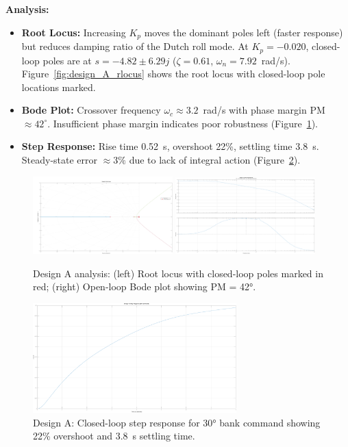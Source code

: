 \textbf{Analysis:}
\begin{itemize}
\item \textbf{Root Locus:} Increasing $K_p$ moves the dominant poles left (faster response) but reduces damping ratio of the Dutch roll mode. At $K_p=-0.020$, closed-loop poles are at $s = -4.82 \pm 6.29j$ ($\zeta=0.61$, $\omega_n=7.92$~rad/s). Figure~\ref{fig:design_A_rlocus} shows the root locus with closed-loop pole locations marked.
\item \textbf{Bode Plot:} Crossover frequency $\omega_c \approx 3.2$~rad/s with phase margin PM $\approx 42^\circ$. Insufficient phase margin indicates poor robustness (Figure~\ref{fig:design_A_bode}).
\item \textbf{Step Response:} Rise time 0.52~s, overshoot 22\%, settling time 3.8~s. Steady-state error $\approx 3\%$ due to lack of integral action (Figure~\ref{fig:design_A_step}).
\end{itemize}

\begin{figure}[h!]
\centering
\includegraphics[width=0.48\textwidth]{../MATLAB/LaTeX_Exports/design_A_root_locus.pdf}
\includegraphics[width=0.48\textwidth]{../MATLAB/LaTeX_Exports/design_A_bode.pdf}
\caption{Design A analysis: (left) Root locus with closed-loop poles marked in red; (right) Open-loop Bode plot showing PM = 42°.}
\label{fig:design_A_rlocus}
\label{fig:design_A_bode}
\end{figure}

\begin{figure}[h!]
\centering
\includegraphics[width=0.7\textwidth]{../MATLAB/LaTeX_Exports/design_A_step.pdf}
\caption{Design A: Closed-loop step response for 30° bank command showing 22\% overshoot and 3.8~s settling time.}
\label{fig:design_A_step}
\end{figure}

